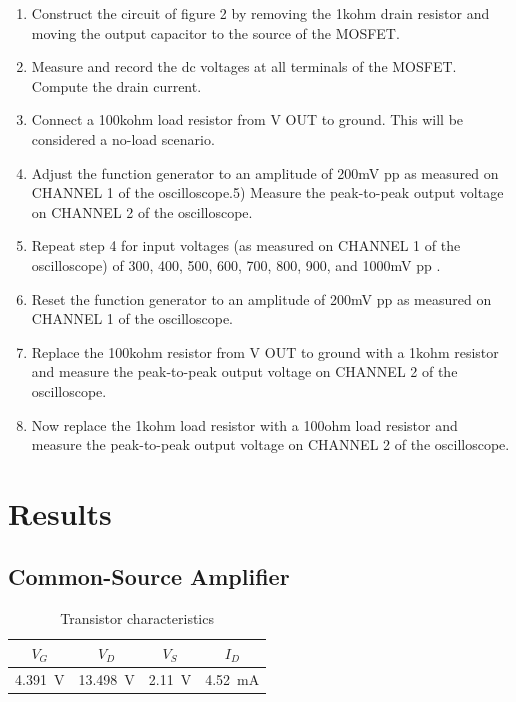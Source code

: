 \begin{enumerate}
\item Construct the circuit of figure 2 by removing the 1kohm drain resistor and moving the output capacitor to the source of the MOSFET.
\item Measure and record the dc voltages at all terminals of the MOSFET. Compute the drain current.
\item Connect a 100kohm load resistor from V OUT to ground. This will be considered a no-load scenario.
\item Adjust the function generator to an amplitude of 200mV pp as measured on CHANNEL 1 of the oscilloscope.5) Measure the peak-to-peak output voltage on CHANNEL 2 of the oscilloscope.
\item Repeat step 4 for input voltages (as measured on CHANNEL 1 of the oscilloscope) of 300, 400, 500, 600, 700, 800, 900, and 1000mV pp .
\item Reset the function generator to an amplitude of 200mV pp as measured on CHANNEL 1 of the oscilloscope.
\item Replace the 100kohm resistor from V OUT to ground with a 1kohm resistor and measure the peak-to-peak output voltage on CHANNEL 2 of the oscilloscope.
\item Now replace the 1kohm load resistor with a 100ohm load resistor and measure the peak-to-peak output voltage on CHANNEL 2 of the oscilloscope.
\end{enumerate}
\section{Results}

\subsection{Common-Source Amplifier}

\begin{table}[hbtp]
  \centering
  \begin{tabular}{cccc}
    $V_G$ & $V_D$ & $V_S$ & $I_D$ \\
    \hline
    \SI{4.391}{V} & \SI{13.498}{V} & \SI{2.11}{V} & \SI{4.52}{mA} \\
  \end{tabular}
  \caption{\label{tab:tran_common} Transistor characteristics}
\end{table}

